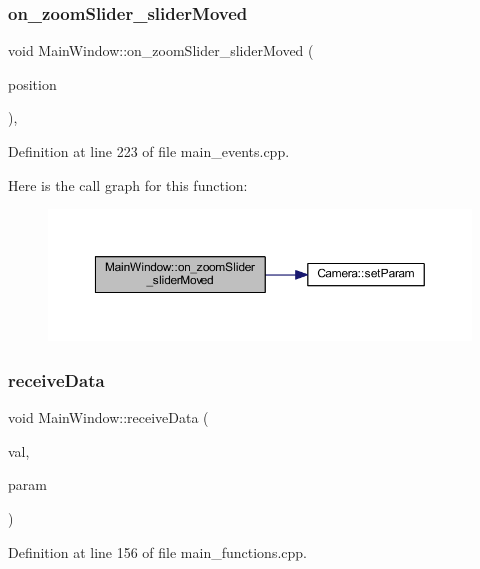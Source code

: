 \subsubsection{\texorpdfstring{on\_zoomSlider\_sliderMoved}{on\_zoomSlider\_sliderMoved}}
{\footnotesize\ttfamily void Main\+Window\+::on\+\_\+zoom\+Slider\+\_\+slider\+Moved (\begin{DoxyParamCaption}\item[{int}]{position }\end{DoxyParamCaption})\hspace{0.3cm}{\ttfamily [private]}, {\ttfamily [slot]}}



Definition at line 223 of file main\+\_\+events.\+cpp.

Here is the call graph for this function\+:
\nopagebreak
\begin{figure}[H]
\begin{center}
\leavevmode
\includegraphics[width=350pt]{class_main_window_a6ae3fbe8e4f3f10db4f2e0e495b98841_cgraph}
\end{center}
\end{figure}
\mbox{\label{class_main_window_ac7fa2374f28a46ed205758559114d79f}} 
\subsubsection{\texorpdfstring{receiveData}{receiveData}}
{\footnotesize\ttfamily void Main\+Window\+::receive\+Data (\begin{DoxyParamCaption}\item[{unsigned int}]{val,  }\item[{Q\+String}]{param }\end{DoxyParamCaption})\hspace{0.3cm}{\ttfamily [slot]}}



Definition at line 156 of file main\+\_\+functions.\+cpp.

